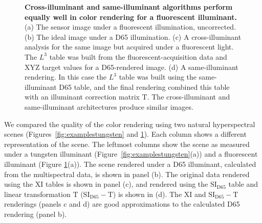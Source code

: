 \documentclass[]{spie}
\newcommand{\Lcube}{L^3}
\newcommand{\XI}{\mathrm{XI}}
\newcommand{\SID}{\mathrm{SI_{D65}}}
\newcommand{\SIDT}{\mathrm{SI_{D65}-T}}
\newcommand{\TT}{\mathrm{T}}
\begin{document}
\begin{figure}[t]
\begin{center}
\begin{minipage}[b]{0.245\textwidth}
 \centering\small\text{(d) $\SIDT$}
\end{minipage}
\end{center}
\caption{\textbf{Cross-illuminant and same-illuminant algorithms perform equally well in color rendering for a fluorescent illuminant.} (a) The sensor image under a fluorescent illumination, uncorrected. (b) The ideal image under a D65 illumination. (c) A cross-illuminant analysis for the same image but acquired under a fluorescent light. The $\Lcube$ table was built from the fluorescent-acquisition data and XYZ target values for a D65-rendered image. (d) A same-illuminant rendering. In this case the $\Lcube$ table was built using the same-illuminant D65 table, and the final rendering combined this table with an illuminant correction matrix $\TT$. The cross-illuminant and same-illuminant architectures produce similar images.}
\label{fig:examplesfluorescent}
\end{figure}

We compared the quality of the color rendering using two natural hyperspectral scenes (Figures~\ref{fig:examplestungsten} and \ref{fig:examplesfluorescent}). Each column shows a different representation of the scene. The leftmost columns show the scene as measured under a tungsten illuminant (Figure~\ref{fig:examplestungsten}(a)) and a fluorescent illuminant (Figure \ref{fig:examplesfluorescent}(a)). The scene rendered under a D65 illuminant, calculated from the multispectral data, is shown in panel (b). The original data rendered using the $\XI$ tables is shown in panel (c), and rendered using the $\SID$ table and linear transformation $\TT$ ($\SIDT$) is shown in (d). The $\XI$ and $\SIDT$ renderings (panels c and d) are good approximations to the calculated D65 rendering (panel b).
\end{document}
